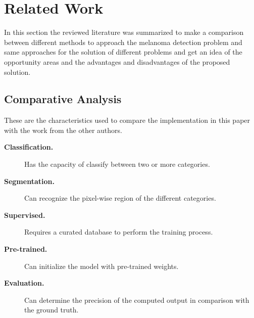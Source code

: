 \section{Related Work}
In this section the reviewed literature was summarized to make a comparison between different methods to approach the melanoma detection problem and same approaches for the solution of different problems and get an idea of the opportunity areas and the advantages and disadvantages of the proposed solution.

\subsection{Comparative Analysis}

These are the characteristics used to compare the implementation in this paper with the work from the other authors.
\begin{description}
  \item[\textbf{Classification.}] Has the capacity of classify between two or more categories.
  \item[\textbf{Segmentation.}] Can recognize the pixel-wise region of the different categories.
  \item[\textbf{Supervised.}] Requires a curated database to perform the training process.
  \item[\textbf{Pre-trained.}] Can initialize the model with pre-trained weights.
  \item[\textbf{Evaluation.}] Can determine the precision of the computed output in comparison with the ground truth.     
\end{description}


